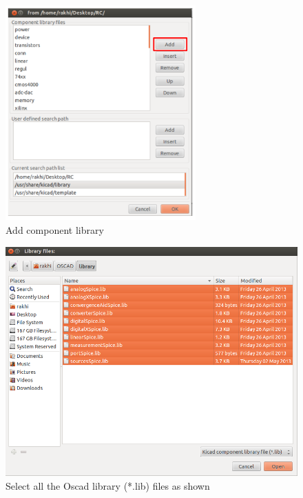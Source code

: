 \begin{figure}
\centering
\includegraphics[width=0.65\textwidth]{figures/lib}
\caption{Add component library}
\label{lib}
\end{figure}
\begin{figure}
\centering
\includegraphics[width=\textwidth]{figures/select}
\caption{Select all the Oscad library (*.lib) files as shown}
\label{select}
\end{figure}
